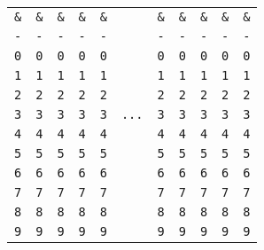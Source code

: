 \begin{adjustwidth}{5ex}{1ex}
	\begin{tabular}{|c|c|c|c|c|c|c|c|c|c|c|}
        \cline{1-5} \cline{7-11}
		\texttt{\&} & \texttt{\&} & \texttt{\&} & \texttt{\&} & \texttt{\&} & & \texttt{\&} & \texttt{\&} & \texttt{\&} & \texttt{\&} & \texttt{\&} \\
        \cline{1-5} \cline{7-11}
		\texttt{-} & \texttt{-} & \texttt{-} & \texttt{-} & \texttt{-} & & \texttt{-} & \texttt{-} & \texttt{-} & \texttt{-} & \texttt{-} \\
        \cline{1-5} \cline{7-11}
		\texttt{0} & \texttt{0} & \texttt{0} & \texttt{0} & \texttt{0} & & \texttt{0} & \texttt{0} & \texttt{0} & \texttt{0} & \texttt{0} \\
        \cline{1-5} \cline{7-11}
		\texttt{1} & \texttt{1} & \texttt{1} & \texttt{1} & \texttt{1} & & \texttt{1} & \texttt{1} & \texttt{1} & \texttt{1} & \texttt{1} \\
        \cline{1-5} \cline{7-11}
		\texttt{2} & \texttt{2} & \texttt{2} & \texttt{2} & \texttt{2} & & \texttt{2} & \texttt{2} & \texttt{2} & \texttt{2} & \texttt{2} \\
        \cline{1-5} \cline{7-11}
		\texttt{3} & \texttt{3} & \texttt{3} & \texttt{3} & \texttt{3} & \texttt{...} & \texttt{3} & \texttt{3} & \texttt{3} & \texttt{3} & \texttt{3} \\
        \cline{1-5} \cline{7-11}
		\texttt{4} & \texttt{4} & \texttt{4} & \texttt{4} & \texttt{4} & & \texttt{4} & \texttt{4} & \texttt{4} & \texttt{4} & \texttt{4} \\
        \cline{1-5} \cline{7-11}
		\texttt{5} & \texttt{5} & \texttt{5} & \texttt{5} & \texttt{5} & & \texttt{5} & \texttt{5} & \texttt{5} & \texttt{5} & \texttt{5} \\
        \cline{1-5} \cline{7-11}
		\texttt{6} & \texttt{6} & \texttt{6} & \texttt{6} & \texttt{6} & & \texttt{6} & \texttt{6} & \texttt{6} & \texttt{6} & \texttt{6} \\
        \cline{1-5} \cline{7-11}
		\texttt{7} & \texttt{7} & \texttt{7} & \texttt{7} & \texttt{7} & & \texttt{7} & \texttt{7} & \texttt{7} & \texttt{7} & \texttt{7} \\
        \cline{1-5} \cline{7-11}
		\texttt{8} & \texttt{8} & \texttt{8} & \texttt{8} & \texttt{8} & & \texttt{8} & \texttt{8} & \texttt{8} & \texttt{8} & \texttt{8} \\
        \cline{1-5} \cline{7-11}
		\texttt{9} & \texttt{9} & \texttt{9} & \texttt{9} & \texttt{9} & & \texttt{9} & \texttt{9} & \texttt{9} & \texttt{9} & \texttt{9} \\
        \cline{1-5} \cline{7-11}
	\end{tabular}
\end{adjustwidth}

